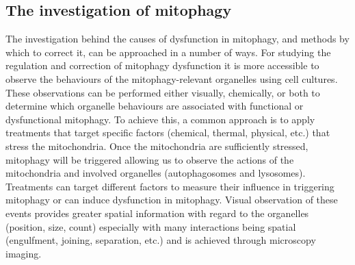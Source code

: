 \subsection{The investigation of mitophagy}
The investigation behind the causes of dysfunction in mitophagy, and methods by which to correct it, can be approached in a number of ways. For studying the regulation and correction of mitophagy dysfunction it is more accessible to observe the behaviours of the mitophagy-relevant organelles using cell cultures. These observations can be performed either visually, chemically, or both to determine which organelle behaviours are associated with functional or dysfunctional mitophagy. To achieve this, a common approach is to apply treatments that target specific factors (chemical, thermal, physical, etc.) that stress the mitochondria. Once the mitochondria are sufficiently stressed, mitophagy will be triggered allowing us to observe the actions of the mitochondria and involved organelles (autophagosomes and lysosomes). Treatments can target different factors to measure their influence in triggering mitophagy or can induce dysfunction in mitophagy. Visual observation of these events provides greater spatial information with regard to the organelles (position, size, count) especially with many interactions being spatial (engulfment, joining, separation, etc.) and is achieved through microscopy imaging.


